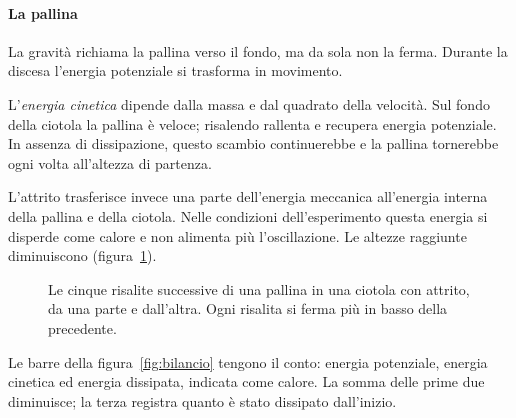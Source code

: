 \documentclass[11pt]{article}
\begin{document}
\paragraph{La pallina} La gravità richiama la pallina verso il fondo, ma da sola non la ferma. Durante la discesa l'energia potenziale si trasforma in movimento.

L'\emph{energia cinetica} dipende dalla massa e dal quadrato della velocità. Sul fondo della ciotola la pallina è veloce; risalendo rallenta e recupera energia potenziale. In assenza di dissipazione, questo scambio continuerebbe e la pallina tornerebbe ogni volta all'altezza di partenza.

L'attrito trasferisce invece una parte dell'energia meccanica all'energia interna della pallina e della ciotola. Nelle condizioni dell'esperimento questa energia si disperde come calore e non alimenta più l'oscillazione. Le altezze raggiunte diminuiscono (figura~\ref{fig:quote}).

\begin{figure}[htbp]
\centering
{}
\caption{Le cinque risalite successive di una pallina in una ciotola con attrito, da una parte e dall'altra. Ogni risalita si ferma più in basso della precedente.}
\label{fig:quote}
\end{figure}

Le barre della figura~\ref{fig:bilancio} tengono il conto: energia potenziale, energia cinetica ed energia dissipata, indicata come calore. La somma delle prime due diminuisce; la terza registra quanto è stato dissipato dall'inizio.
\end{document}
